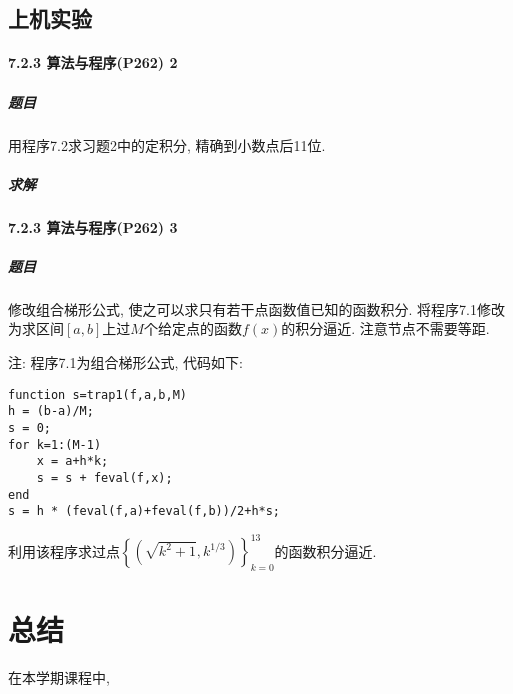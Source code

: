 \documentclass{ctexart}
\begin{document}
\subsection{上机实验}
\paragraph{7.2.3 算法与程序(P262) 2}
\subparagraph{题目}
用程序7.2求习题2中的定积分, 精确到小数点后11位.
\subparagraph{求解}

\paragraph{7.2.3 算法与程序(P262) 3}
\subparagraph{题目}
修改组合梯形公式, 使之可以求只有若干点函数值已知的函数积分. 将程序7.1修改为求区间$\left[a,b\right]$上过$M$个给定点的函数$f\left(x\right)$的积分逼近. 注意节点不需要等距.

注: 程序7.1为组合梯形公式, 代码如下:
\begin{lstlisting}
function s=trap1(f,a,b,M)
h = (b-a)/M;
s = 0;
for k=1:(M-1)
	x = a+h*k;
	s = s + feval(f,x);
end
s = h * (feval(f,a)+feval(f,b))/2+h*s;
\end{lstlisting}
 利用该程序求过点$\left\{\left(\sqrt{k^2+1},k^{1/3} \right) \right\}_{k=0}^{13}$的函数积分逼近.
\section{总结}
在本学期课程中, 
\end{document}
